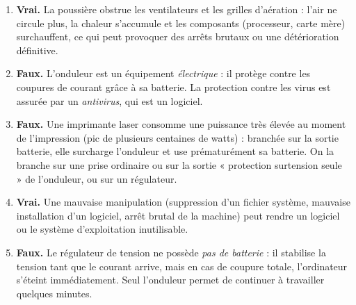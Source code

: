 \documentclass[11pt]{article}
\begin{document}
\begin{corrige}
\begin{enumerate}
\item \textbf{Vrai.} La poussière obstrue les ventilateurs et les grilles d'aération : l'air ne circule plus, la chaleur s'accumule et les composants (processeur, carte mère) surchauffent, ce qui peut provoquer des arrêts brutaux ou une détérioration définitive.
\item \textbf{Faux.} L'onduleur est un équipement \emph{électrique} : il protège contre les coupures de courant grâce à sa batterie. La protection contre les virus est assurée par un \emph{antivirus}, qui est un logiciel.
\item \textbf{Faux.} Une imprimante laser consomme une puissance très élevée au moment de l'impression (pic de plusieurs centaines de watts) : branchée sur la sortie batterie, elle surcharge l'onduleur et use prématurément sa batterie. On la branche sur une prise ordinaire ou sur la sortie « protection surtension seule » de l'onduleur, ou sur un régulateur.
\item \textbf{Vrai.} Une mauvaise manipulation (suppression d'un fichier système, mauvaise installation d'un logiciel, arrêt brutal de la machine) peut rendre un logiciel ou le système d'exploitation inutilisable.
\item \textbf{Faux.} Le régulateur de tension ne possède \emph{pas de batterie} : il stabilise la tension tant que le courant arrive, mais en cas de coupure totale, l'ordinateur s'éteint immédiatement. Seul l'onduleur permet de continuer à travailler quelques minutes.
\end{enumerate}
\end{corrige}
\end{document}
